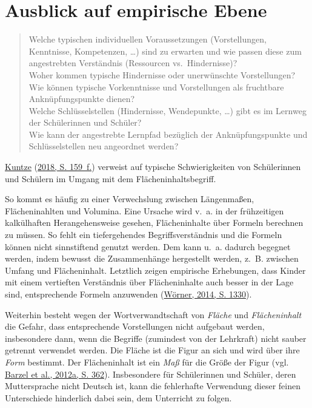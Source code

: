 \documentclass[
  ngerman,
]{scrbook}
\theoremstyle{definition}
\theoremstyle{definition}
\theoremstyle{definition}
\theoremstyle{definition}
\theoremstyle{remark}
\begin{document}
\hypertarget{ausblick-auf-empirische-ebene}{%
\section{Ausblick auf empirische Ebene}\label{ausblick-auf-empirische-ebene}}

\begin{quote}
Welche typischen individuellen Voraussetzungen (Vorstellungen, Kenntnisse, Kompetenzen, \ldots) sind zu erwarten und wie passen diese zum angestrebten Verständnis (Ressourcen vs.~Hindernisse)?\\
Woher kommen typische Hindernisse oder unerwünschte Vorstellungen?\\
Wie können typische Vorkenntnisse und Vorstellungen als fruchtbare Anknüpfungspunkte dienen?\\
Welche Schlüsselstellen (Hindernisse, Wendepunkte, \ldots) gibt es im Lernweg der Schülerinnen und Schüler?\\
Wie kann der angestrebte Lernpfad bezüglich der Anknüpfungspunkte und Schlüsselstellen neu angeordnet werden?
\end{quote}

\protect\hyperlink{ref-Kuntze2018}{Kuntze} (\protect\hyperlink{ref-Kuntze2018}{2018, S. 159~f.}) verweist auf typische Schwierigkeiten von Schülerinnen und Schülern im Umgang mit dem Flächeninhaltsbegriff.

So kommt es häufig zu einer Verwechslung zwischen Längenmaßen, Flächeninahlten und Volumina. Eine Ursache wird v.~a. in der frühzeitigen kalkülhaften Herangehensweise gesehen, Flächeninhalte über Formeln berechnen zu müssen. So fehlt ein tiefergehendes Begriffsverständnis und die Formeln können nicht sinnstiftend genutzt werden. Dem kann u.~a. dadurch begegnet werden, indem bewusst die Zusammenhänge hergestellt werden, z.~B. zwischen Umfang und Flächeninhalt.
Letztlich zeigen empirische Erhebungen, dass Kinder mit einem vertieften Verständnis über Flächeninhalte auch besser in der Lage sind, entsprechende Formeln anzuwenden (\protect\hyperlink{ref-Worner2014}{Wörner, 2014, S. 1330}).

Weiterhin besteht wegen der Wortverwandtschaft von \emph{Fläche} und \emph{Flächeninhalt} die Gefahr, dass entsprechende Vorstellungen nicht aufgebaut werden, insbesondere dann, wenn die Begriffe (zumindest von der Lehrkraft) nicht sauber getrennt verwendet werden. Die Fläche ist die Figur an sich und wird über ihre \emph{Form} bestimmt. Der Flächeninhalt ist ein \emph{Maß} für die Größe der Figur (vgl. \protect\hyperlink{ref-Barzel2012a}{Barzel et al., 2012a, S. 362}). Insbesondere für Schülerinnen und Schüler, deren Muttersprache nicht Deutsch ist, kann die fehlerhafte Verwendung dieser feinen Unterschiede hinderlich dabei sein, dem Unterricht zu folgen.
\end{document}
